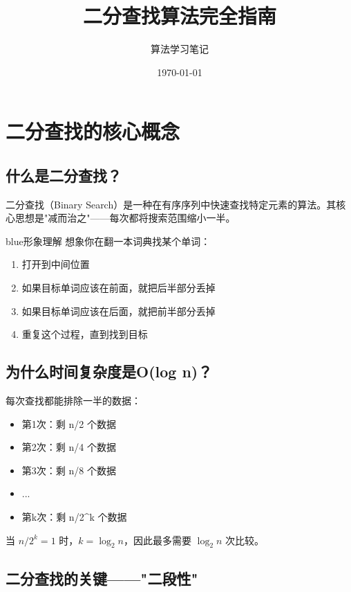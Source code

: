 \documentclass[12pt,a4paper]{article}
\title{\Huge \textbf{二分查找算法完全指南}}
\author{算法学习笔记}
\date{\today}
\begin{document}
	
	\maketitle
	
	\tableofcontents
	\newpage
	
	\section{二分查找的核心概念}
	
	\subsection{什么是二分查找？}
	
	二分查找（Binary Search）是一种在有序序列中快速查找特定元素的算法。其核心思想是"减而治之"——每次都将搜索范围缩小一半。
	
	\begin{mybox}{blue}{形象理解}
		想象你在翻一本词典找某个单词：
		\begin{enumerate}
			\item 打开到中间位置
			\item 如果目标单词应该在前面，就把后半部分丢掉
			\item 如果目标单词应该在后面，就把前半部分丢掉
			\item 重复这个过程，直到找到目标
		\end{enumerate}
	\end{mybox}
	
	\subsection{为什么时间复杂度是O(log n)？}
	
	每次查找都能排除一半的数据：
	\begin{itemize}
		\item 第1次：剩 n/2 个数据
		\item 第2次：剩 n/4 个数据
		\item 第3次：剩 n/8 个数据
		\item ...
		\item 第k次：剩 n/2^k 个数据
	\end{itemize}
	
	当 $n/2^k = 1$ 时，$k = \log_2 n$，因此最多需要 $\log_2 n$ 次比较。
	
	\subsection{二分查找的关键——"二段性"}
	
\end{document}
